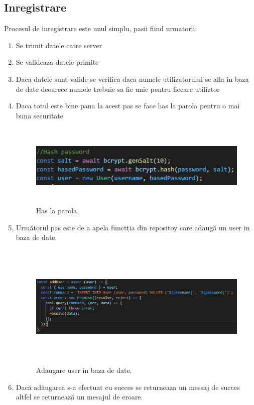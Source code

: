 \subsection{Inregistrare}
\par Procesul de inregistrare este unul simplu, pasii fiind urmatorii:
\begin{enumerate}
  	\item Se trimit datele catre server
  	\item Se valideaza datele primite 
 	\item Daca datele sunt valide se verifica daca numele utilizatorului se afla in baza de date deoarece numele trebuie sa fie unic pentru fiecare utiliztor
	\item Daca totul este bine pana la acest pas se face has la parola pentru o mai buna securitate
		\begin{figure}[htbp]
			\centerline{\includegraphics[width=15cm, height=4cm]{figures/hasparola.png}}
			\caption{Has la parola.}
			\label{fig}
		\end{figure}
	\item Următorul pas este de a apela functția din repositoy care adaugă un user in baza de date.
		\begin{figure}[htbp]
			\centerline{\includegraphics[width=19cm, height=6cm]{figures/adaugare user.png}}
			\caption{Adaugare user in baza de date.}
			\label{fig}
		\end{figure}	
	\item Dacă adăugarea s-a efectuat cu succes se returneaza un messaj de succes altfel se returnează un mesajul de eroare.
\end{enumerate}

